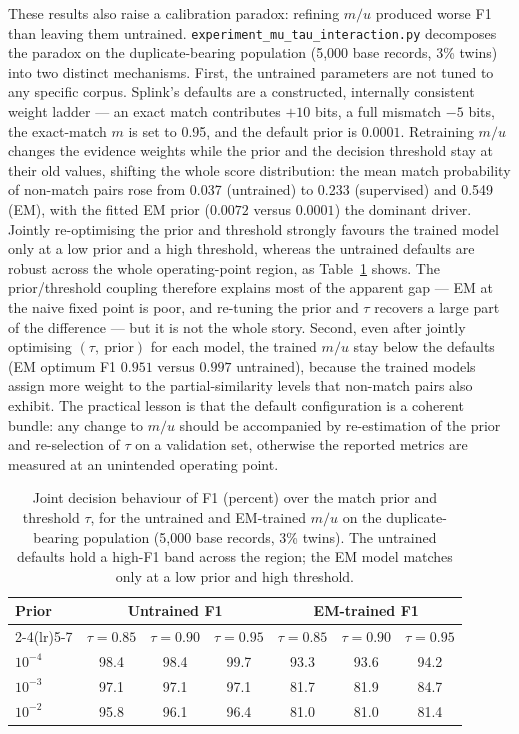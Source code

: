 \documentclass[conference]{IEEEtran}
\begin{document}
These results also raise a calibration paradox: refining $m/u$ produced worse F1 than leaving them untrained.\label{sec:calibration-paradox} \texttt{experiment\_mu\_tau\_interaction.py} decomposes the paradox on the duplicate-bearing population (5{,}000 base records, 3\% twins) into two distinct mechanisms. First, the untrained parameters are not tuned to any specific corpus. Splink's defaults are a constructed, internally consistent weight ladder --- an exact match contributes $+10$ bits, a full mismatch $-5$ bits, the exact-match $m$ is set to 0.95, and the default prior is $0.0001$. Retraining $m/u$ changes the evidence weights while the prior and the decision threshold stay at their old values, shifting the whole score distribution: the mean match probability of non-match pairs rose from 0.037 (untrained) to 0.233 (supervised) and 0.549 (EM), with the fitted EM prior ($0.0072$ versus $0.0001$) the dominant driver. Jointly re-optimising the prior and threshold strongly favours the trained model only at a low prior and a high threshold, whereas the untrained defaults are robust across the whole operating-point region, as Table~\ref{tab:mu-tau-surface} shows. The prior/threshold coupling therefore explains most of the apparent gap --- EM at the naive fixed point is poor, and re-tuning the prior and $\tau$ recovers a large part of the difference --- but it is not the whole story. Second, even after jointly optimising $(\tau,\ \text{prior})$ for each model, the trained $m/u$ stay below the defaults (EM optimum F1 $0.951$ versus $0.997$ untrained), because the trained models assign more weight to the partial-similarity levels that non-match pairs also exhibit. The practical lesson is that the default configuration is a coherent bundle: any change to $m/u$ should be accompanied by re-estimation of the prior and re-selection of $\tau$ on a validation set, otherwise the reported metrics are measured at an unintended operating point.

\begin{table}[t]
\centering
\caption{Joint decision behaviour of F1 (percent) over the match prior and threshold $\tau$, for the untrained and EM-trained $m/u$ on the duplicate-bearing population (5{,}000 base records, 3\% twins). The untrained defaults hold a high-F1 band across the region; the EM model matches only at a low prior and high threshold.}
\label{tab:mu-tau-surface}
\begin{tabular}{l ccc ccc}
\toprule
Prior & \multicolumn{3}{c}{Untrained F1} & \multicolumn{3}{c}{EM-trained F1}\\
\cmidrule(lr){2-4}\cmidrule(lr){5-7}
 & $\tau{=}0.85$ & $\tau{=}0.90$ & $\tau{=}0.95$ & $\tau{=}0.85$ & $\tau{=}0.90$ & $\tau{=}0.95$\\
\midrule
$10^{-4}$ & 98.4 & 98.4 & 99.7 & 93.3 & 93.6 & 94.2\\
$10^{-3}$ & 97.1 & 97.1 & 97.1 & 81.7 & 81.9 & 84.7\\
$10^{-2}$ & 95.8 & 96.1 & 96.4 & 81.0 & 81.0 & 81.4\\
\bottomrule
\end{tabular}
\end{table}
\end{document}
